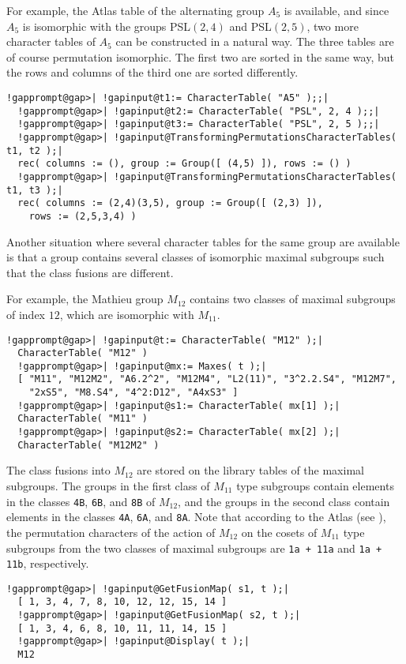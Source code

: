 \documentclass[a4paper,11pt]{report}
\begin{document}
{{{ For example, the \textsf{Atlas} table of the alternating group $A_5$ is available, and since $A_5$ is isomorphic with the groups PSL$(2, 4)$ and PSL$(2, 5)$, two more character tables of $A_5$ can be constructed in a natural way. The three tables are of course
permutation isomorphic. The first two are sorted in the same way, but the rows
and columns of the third one are sorted differently. 
\begin{Verbatim}[commandchars=!@|,fontsize=\small,frame=single,label=Example]
  !gapprompt@gap>| !gapinput@t1:= CharacterTable( "A5" );;|
  !gapprompt@gap>| !gapinput@t2:= CharacterTable( "PSL", 2, 4 );;|
  !gapprompt@gap>| !gapinput@t3:= CharacterTable( "PSL", 2, 5 );;|
  !gapprompt@gap>| !gapinput@TransformingPermutationsCharacterTables( t1, t2 );|
  rec( columns := (), group := Group([ (4,5) ]), rows := () )
  !gapprompt@gap>| !gapinput@TransformingPermutationsCharacterTables( t1, t3 );|
  rec( columns := (2,4)(3,5), group := Group([ (2,3) ]), 
    rows := (2,5,3,4) )
\end{Verbatim}
 Another situation where several character tables for the same group are
available is that a group contains several classes of isomorphic maximal
subgroups such that the class fusions are different. 

 For example, the Mathieu group $M_{12}$ contains two classes of maximal subgroups of index $12$, which are isomorphic with $M_{11}$. 
\begin{Verbatim}[commandchars=!@|,fontsize=\small,frame=single,label=Example]
  !gapprompt@gap>| !gapinput@t:= CharacterTable( "M12" );|
  CharacterTable( "M12" )
  !gapprompt@gap>| !gapinput@mx:= Maxes( t );|
  [ "M11", "M12M2", "A6.2^2", "M12M4", "L2(11)", "3^2.2.S4", "M12M7", 
    "2xS5", "M8.S4", "4^2:D12", "A4xS3" ]
  !gapprompt@gap>| !gapinput@s1:= CharacterTable( mx[1] );|
  CharacterTable( "M11" )
  !gapprompt@gap>| !gapinput@s2:= CharacterTable( mx[2] );|
  CharacterTable( "M12M2" )
\end{Verbatim}
 The class fusions into $M_{12}$ are stored on the library tables of the maximal subgroups. The groups in the
first class of $M_{11}$ type subgroups contain elements in the classes \texttt{4B}, \texttt{6B}, and \texttt{8B} of $M_{12}$, and the groups in the second class contain elements in the classes \texttt{4A}, \texttt{6A}, and \texttt{8A}. Note that according to the \textsf{Atlas} (see \cite[p.{\nobreakspace}33]{CCN85}), the permutation characters of the action of $M_{12}$ on the cosets of $M_{11}$ type subgroups from the two classes of maximal subgroups are \texttt{1a + 11a} and \texttt{1a + 11b}, respectively. 
\begin{Verbatim}[commandchars=!@|,fontsize=\small,frame=single,label=Example]
  !gapprompt@gap>| !gapinput@GetFusionMap( s1, t );|
  [ 1, 3, 4, 7, 8, 10, 12, 12, 15, 14 ]
  !gapprompt@gap>| !gapinput@GetFusionMap( s2, t );|
  [ 1, 3, 4, 6, 8, 10, 11, 11, 14, 15 ]
  !gapprompt@gap>| !gapinput@Display( t );|
  M12
  

\end{Verbatim}}}}
\end{document}
